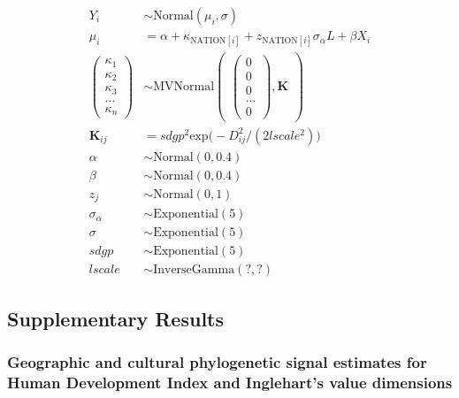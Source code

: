 \documentclass[english,man,floatsintext]{apa6}
\begin{document}
\[
\begin{aligned}
Y_{i} &\sim \text{Normal}(\mu_{i},\sigma) \\
\mu_{i} &= \alpha + \kappa_{\text{NATION}[i]} + z_{\text{NATION}[i]}\sigma_{\alpha}L + \beta X_{i} \\
\begin{pmatrix}
\kappa_{1} \\ \kappa_{2} \\ \kappa_{3} \\ ... \\ \kappa_{n}
\end{pmatrix} &\sim \text{MVNormal}
\begin{pmatrix}
\begin{pmatrix}
0 \\ 0 \\ 0 \\ ... \\ 0
\end{pmatrix},\textbf{K}
\end{pmatrix}\\
\textbf{K}_{ij} &= sdgp^2 \text{exp} \big (-D_{ij}^2 / (2 lscale^2) \big )\\
\alpha &\sim \text{Normal}(0, 0.4) \\
\beta &\sim \text{Normal}(0, 0.4) \\
z_{j} &\sim \text{Normal}(0, 1)\\
\sigma_{\alpha} &\sim \text{Exponential}(5) \\
\sigma &\sim \text{Exponential}(5) \\
sdgp &\sim \text{Exponential}(5) \\
lscale &\sim \text{InverseGamma}(?,?)
\end{aligned}
\]

\newpage

\hypertarget{supplementary-results}{%
\subsection{Supplementary Results}\label{supplementary-results}}

\hypertarget{geographic-and-cultural-phylogenetic-signal-estimates-for-human-development-index-and-ingleharts-value-dimensions}{%
\subsubsection{Geographic and cultural phylogenetic signal estimates for Human Development Index and Inglehart's value dimensions}\label{geographic-and-cultural-phylogenetic-signal-estimates-for-human-development-index-and-ingleharts-value-dimensions}}
\end{document}
